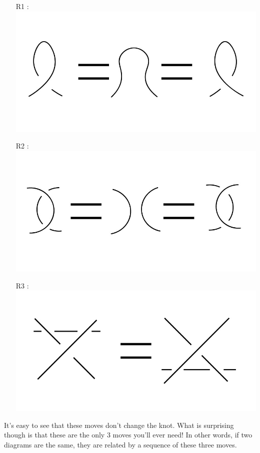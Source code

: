\documentclass[12 pt]{article}
\begin{document}
\begin{enumerate}
\item[R1]:\\
\includegraphics[height = 1.5 in]{reidemeister_1.jpg}
\item[R2]:\\
\includegraphics[height = 1.5 in]{reidemeister_2.jpg}
\item[R3]:\\
\includegraphics[height = 1.5 in]{reidemeister_3.jpg}
\end{enumerate}

It's easy to see that these moves don't change the knot. What is surprising though is that these are the only 3 moves you'll ever need! In other words, if two diagrams are the same, they are related by a sequence of these three moves.
\end{document}
